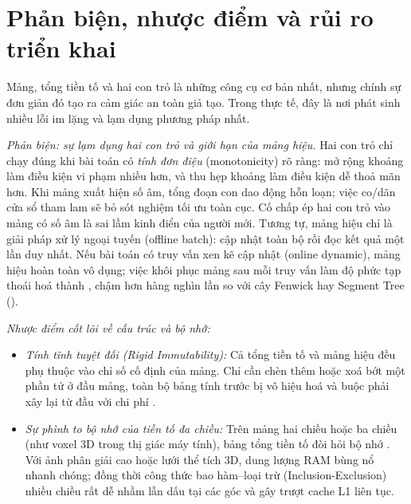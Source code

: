 \documentclass[../../algorithm.tex]{subfiles}
\begin{document}
\section{Phản biện, nhược điểm và rủi ro triển khai}

Mảng, tổng tiền tố và hai con trỏ là những công cụ cơ bản nhất, nhưng chính sự đơn giản đó tạo ra cảm giác an toàn giả tạo. Trong thực tế, đây là nơi phát sinh nhiều lỗi im lặng và lạm dụng phương pháp nhất.

\emph{Phản biện: sự lạm dụng hai con trỏ và giới hạn của mảng hiệu.} Hai con trỏ chỉ chạy đúng khi bài toán có \emph{tính đơn điệu} (monotonicity) rõ ràng: mở rộng khoảng làm điều kiện vi phạm nhiều hơn, và thu hẹp khoảng làm điều kiện dễ thoả mãn hơn. Khi mảng xuất hiện số âm, tổng đoạn con dao động hỗn loạn; việc co/dãn cửa sổ tham lam sẽ bỏ sót nghiệm tối ưu toàn cục. Cố chấp ép hai con trỏ vào mảng có số âm là sai lầm kinh điển của người mới. Tương tự, mảng hiệu chỉ là giải pháp xử lý ngoại tuyến (offline batch): cập nhật toàn bộ rồi đọc kết quả một lần duy nhất. Nếu bài toán có truy vấn xen kẽ cập nhật (online dynamic), mảng hiệu hoàn toàn vô dụng; việc khôi phục mảng sau mỗi truy vấn làm độ phức tạp thoái hoá thành , chậm hơn hàng nghìn lần so với cây Fenwick hay Segment Tree ().

\emph{Nhược điểm cốt lõi về cấu trúc và bộ nhớ:}
\begin{itemize}
\item \emph{Tính tĩnh tuyệt đối (Rigid Immutability):} Cả tổng tiền tố và mảng hiệu đều phụ thuộc vào chỉ số cố định của mảng. Chỉ cần chèn thêm hoặc xoá bớt một phần tử ở đầu mảng, toàn bộ bảng tính trước bị vô hiệu hoá và buộc phải xây lại từ đầu với chi phí .
\item \emph{Sự phình to bộ nhớ của tiền tố đa chiều:} Trên mảng hai chiều hoặc ba chiều (như voxel 3D trong thị giác máy tính), bảng tổng tiền tố đòi hỏi bộ nhớ . Với ảnh phân giải cao hoặc lưới thể tích 3D, dung lượng RAM bùng nổ nhanh chóng; đồng thời công thức bao hàm--loại trừ (Inclusion-Exclusion) nhiều chiều rất dễ nhầm lẫn dấu tại các góc và gây trượt cache L1 liên tục.
\end{itemize}
\end{document}

